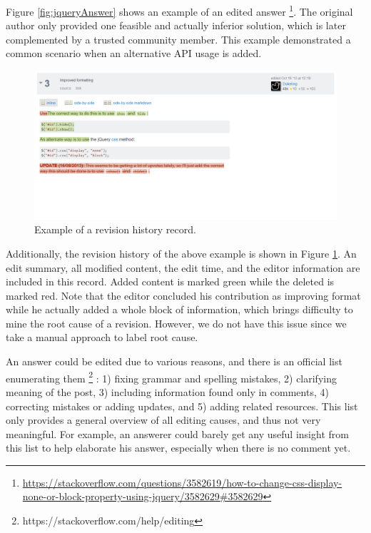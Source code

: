 \documentclass[10pt,conference]{IEEEtran}
\begin{document}
Figure \ref{fig:jqueryAnswer} shows an example of an edited answer%
\footnote{\url{https://stackoverflow.com/questions/3582619/how-to-change-css-display-none-or-block-property-using-jquery/3582629#3582629}}. The original author only provided one feasible and actually inferior solution, which is later complemented by a trusted community member. This example demonstrated a common scenario when an alternative API usage is added.

\begin{figure}
  \includegraphics[width=\linewidth]{figure2.png}
  \caption{Example of a revision history record.}
  \label{fig:jqueryAnswerRevision}
\end{figure}

Additionally, the revision history of the above example is shown in Figure \ref{fig:jqueryAnswerRevision}. An edit summary, all modified content, the edit time, and the editor information are included in this record. Added content is marked green while the deleted is marked red. Note that the editor concluded his contribution as improving format while he actually added a whole block of information, which brings difficulty to mine the root cause of a revision. However, we do not have this issue since we take a manual approach to label root cause.

An answer could be edited due to various reasons, and there is an official list enumerating them \footnote{https://stackoverflow.com/help/editing} : 1) fixing grammar and spelling mistakes, 2) clarifying meaning of the post, 3) including information found only in comments, 4) correcting mistakes or adding updates, and 5) adding related resources. This list only provides a general overview of all editing causes, and thus not very meaningful. For example, an answerer could barely get any useful insight from this list to help elaborate his answer, especially when there is no comment yet.
\end{document}
